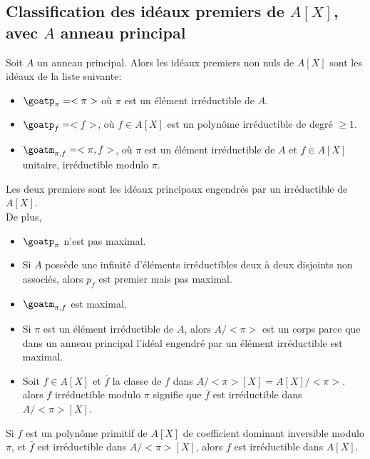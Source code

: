 \subsection{Classification des idéaux premiers de $A[X]$, avec $A$ anneau principal}

\begin{theorem}
	Soit $A$ un anneau principal. Alors les idéaux premiers non nuls de $A[X]$ sont les idéaux de la liste suivante:
	\begin{itemize}
		\item $\goatp_{\pi} = <\pi>$ où $\pi$ est un élément irréductible de $A$.
		\item $\goatp_f = <f>$, où $f \in A[X]$ est un polynôme irréductible de degré $\geq 1$.
		\item $\goatm_{\pi,f} = <\pi,f>$, où $\pi$ est un élément irréductible de $A$ et $f \in A[X]$ unitaire, irréductible modulo $\pi$.
	\end{itemize}
	Les deux premiers sont les idéaux principaux engendrés par un irréductible de $A[X]$.\\
	De plus,
	\begin{itemize}
		\item $\goatp_{\pi}$ n'est pas maximal.
		\item Si $A$ possède une infinité d'éléments irréductibles deux à deux disjoints non associés, alors $p_f$ est premier mais pas maximal.
		\item $\goatm_{\pi,f}$ est maximal.
	\end{itemize}
\end{theorem}


\begin{rappel}[Irréductibilité]
	\begin{itemize}
		\item
		      Si $\pi$ est un élément irréductible de $A$, alors $A/<\pi>$ est un corps parce que dans un anneau
		      principal l'idéal engendré par un élément irréductible est maximal.\\
		\item Soit  $f \in A[X]$ et $\bar{f}$ la classe de $f$ dans $A/<\pi>[X] = A[X]/<\pi>$.\\
		      alors $f$ irréductible modulo $\pi$ signifie que $\bar{f}$ est irréductible dans $A/<\pi>[X]$.
	\end{itemize}
\end{rappel}

\begin{rappel}
	Si $f$ est un polynôme primitif de $A[X]$ de coefficient dominant inversible modulo $\pi$, et $\bar{f}$ est irréductible dans $A/<\pi>[X]$, alors $f$ est irréductible dans $A[X]$.
\end{rappel}

